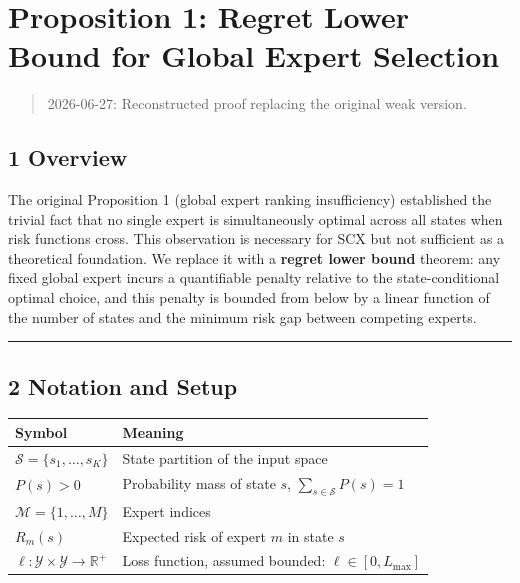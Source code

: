 \documentclass[
  12pt,
]{article}
\author{SCX}
\date{2026}
\begin{document}
\section{Proposition 1: Regret Lower Bound for Global Expert
Selection}\label{proposition-1-regret-lower-bound-for-global-expert-selection}

\begin{quote}
2026-06-27: Reconstructed proof replacing the original weak version.
\end{quote}

\subsection{1 Overview}\label{overview}

The original Proposition 1 (global expert ranking insufficiency) established the trivial
fact that no single expert is simultaneously optimal across all states
when risk functions cross. This observation is necessary for SCX but not
sufficient as a theoretical foundation. We replace it with a
\textbf{regret lower bound} theorem: any fixed global expert incurs a
quantifiable penalty relative to the state-conditional optimal choice,
and this penalty is bounded from below by a linear function of the
number of states and the minimum risk gap between competing experts.

\begin{center}\rule{0.5\linewidth}{0.5pt}\end{center}

\subsection{2 Notation and Setup}\label{notation-and-setup}

\begin{longtable}[]{@{}
  >{\raggedright\arraybackslash}p{}
  >{\raggedright\arraybackslash}p{}@{}}
\toprule\noalign{}
\begin{minipage}[b]{\linewidth}\raggedright
Symbol
\end{minipage} & \begin{minipage}[b]{\linewidth}\raggedright
Meaning
\end{minipage} \\
\midrule\noalign{}
\endhead
\bottomrule\noalign{}
\endlastfoot
\(\mathcal{S} = \{s_1,\dots,s_K\}\) & State partition of the input
space \\
\(P(s) > 0\) & Probability mass of state \(s\),
\(\sum_{s \in \mathcal{S}} P(s) = 1\) \\
\(\mathcal{M} = \{1,\dots,M\}\) & Expert indices \\
\(R_m(s)\) & Expected risk of expert \(m\) in state \(s\) \\
\(\ell: \mathcal{Y} \times \mathcal{Y} \to \mathbb{R}^+\) & Loss
function, assumed bounded: \(\ell \in [0, L_{\max}]\) \\
\end{longtable}
\end{document}

